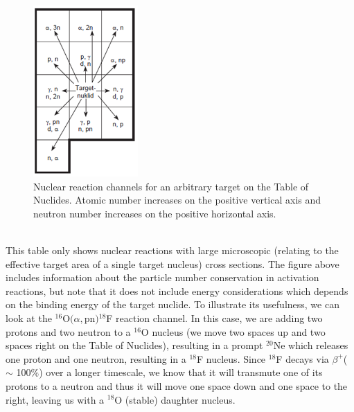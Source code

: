 \documentclass[]{article}
\begin{document}
\begin{figure}[h!]
	\includegraphics[width=4cm]{nuclearReactions.png}
	\centering
	\captionsetup{justification=centering,margin=2cm}
	\caption{Nuclear reaction channels for an arbitrary target on the Table of Nuclides\cite{nuclearReactionsPIC}. Atomic number increases on the positive vertical axis and neutron number increases on the positive horizontal axis.}
	\label{fig:tableOfnuclides}
\end{figure}~\\
This table only shows nuclear reactions with large microscopic (relating to the effective target area of a single target nucleus) cross sections. The figure above includes information about the particle number conservation in activation reactions, but note that it does not include energy considerations which depends on the binding energy of the target nuclide. To illustrate its usefulness, we can look at the ${}^{16}$O$(\alpha,$pn$){}^{18}$F reaction channel. In this case, we are adding two protons and two neutron to a ${}^{16}$O nucleus (we move two spaces up and two spaces right on the Table of Nuclides), resulting in a prompt ${}^{20}$Ne which releases one proton and one neutron, resulting in a ${}^{18}$F nucleus. Since ${}^{18}$F decays via $\beta ^+$($\sim$ 100$\%$) over a longer timescale, we know that it will transmute one of its protons to a neutron and thus it will move one space down and one space to the right, leaving us with a ${}^{18}$O (stable) daughter nucleus.
\end{document}
